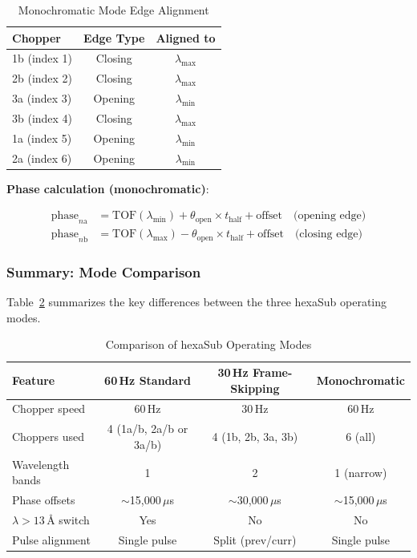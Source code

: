 \documentclass[tm]{ornltm}
\begin{document}
\begin{table}[ht]
\centering

\caption{Monochromatic Mode Edge Alignment}
\label{tab:mono_alignment}
\begin{tabular}{lcc}
\toprule
Chopper & Edge Type & Aligned to \\
\midrule
1b (index 1) & Closing & $\lambda_{\max}$ \\
2b (index 2) & Closing & $\lambda_{\max}$ \\
3a (index 3) & Opening & $\lambda_{\min}$ \\
3b (index 4) & Closing & $\lambda_{\max}$ \\
1a (index 5) & Opening & $\lambda_{\min}$ \\
2a (index 6) & Opening & $\lambda_{\min}$ \\
\bottomrule
\end{tabular}

\end{table}

\textbf{Phase calculation (monochromatic)}:

\begin{align}
\text{phase}_{n\text{a}} &= \text{TOF}(\lambda_{\min}) + \theta_{\text{open}} \times t_{\text{half}} + \text{offset} \quad \text{(opening edge)} \\
\text{phase}_{n\text{b}} &= \text{TOF}(\lambda_{\max}) - \theta_{\text{open}} \times t_{\text{half}} + \text{offset} \quad \text{(closing edge)}
\end{align}

\subsubsection{Summary: Mode Comparison}

Table~\ref{tab:mode_comparison} summarizes the key differences between the three hexaSub operating modes.

\begin{table}[ht]
\centering

\caption{Comparison of hexaSub Operating Modes}
\label{tab:mode_comparison}
\begin{tabular}{lccc}
\toprule
Feature & 60\,Hz Standard & 30\,Hz Frame-Skipping & Monochromatic \\
\midrule
Chopper speed & 60\,Hz & 30\,Hz & 60\,Hz \\
Choppers used & 4 (1a/b, 2a/b or 3a/b) & 4 (1b, 2b, 3a, 3b) & 6 (all) \\
Wavelength bands & 1 & 2 & 1 (narrow) \\
Phase offsets & $\sim$15,000\,$\mu$s & $\sim$30,000\,$\mu$s & $\sim$15,000\,$\mu$s \\
$\lambda > 13$\,\AA{} switch & Yes & No & No \\
Pulse alignment & Single pulse & Split (prev/curr) & Single pulse \\
\bottomrule
\end{tabular}

\end{table}
\end{document}
